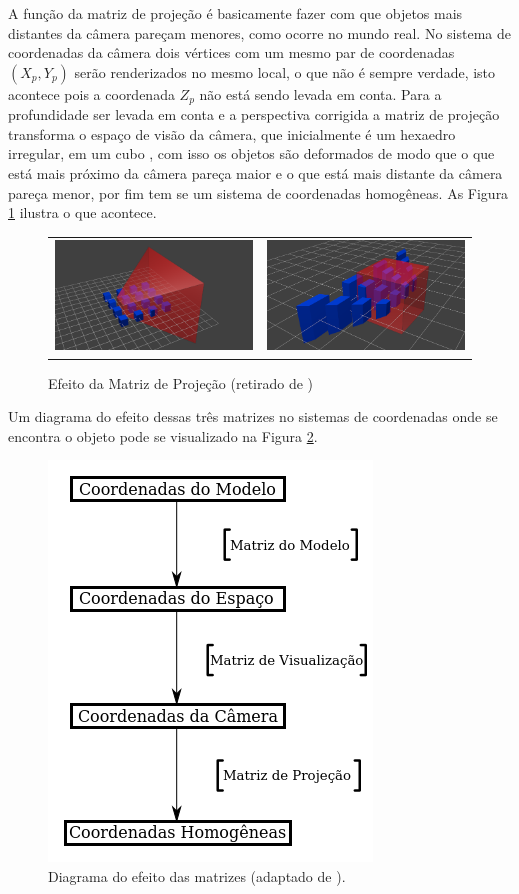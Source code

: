 {A função da matriz de projeção é basicamente fazer com que objetos mais distantes da câmera pareçam menores, como ocorre no mundo real. No sistema de coordenadas da câmera dois vértices com um mesmo par de coordenadas $(X_p,Y_p)$ serão renderizados no mesmo local, o que não é sempre verdade, isto acontece pois a coordenada $Z_p$ não está sendo levada em conta. Para a profundidade ser levada em conta e a perspectiva corrigida a matriz de projeção transforma o espaço de visão da câmera, que inicialmente é um hexaedro irregular, em um cubo \cite{openGlTutorial}, com isso os objetos são deformados de modo que o que está mais próximo da câmera pareça maior e o que está mais distante da câmera pareça menor, por fim tem se um sistema de coordenadas homogêneas. As Figura \ref{fig:mat_proj} ilustra o que acontece.

\begin{figure}[!htb]
   \centering
\begin{tabular}{cc}
\includegraphics[width=0.4\linewidth]{./figs/TG_projection_matrix_1.png}&
\includegraphics[width=0.4\linewidth]{./figs/TG_projection_matrix_2.png}
\end{tabular}
    \caption{Efeito da Matriz de Projeção (retirado de \cite{openGlTutorial})}
    \label{fig:mat_proj}
\end{figure}

Um diagrama do efeito dessas três matrizes no sistemas de coordenadas onde se encontra o objeto pode se visualizado na Figura \ref{fig:mat_diagrama}.

\begin{figure}[h!]
\centering
\includegraphics[width=.45\linewidth]{figs/TG_matrices_diagram_pt.png}
\caption{Diagrama do efeito das matrizes (adaptado de \cite{openGlTutorial}).}
\label{fig:mat_diagrama}
\end{figure}

}
